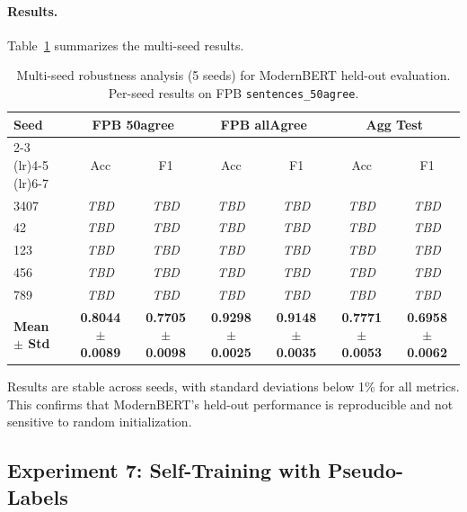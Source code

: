 \documentclass[11pt]{article}
\begin{document}
\paragraph{Results.}
Table~\ref{tab:multiseed} summarizes the multi-seed results.

\begin{table}[h]
\centering
\caption{Multi-seed robustness analysis (5 seeds) for ModernBERT held-out evaluation. Per-seed results on FPB \texttt{sentences\_50agree}.}
\label{tab:multiseed}
\begin{tabular}{lcccccc}
\toprule
\textbf{Seed} & \multicolumn{2}{c}{\textbf{FPB 50agree}} & \multicolumn{2}{c}{\textbf{FPB allAgree}} & \multicolumn{2}{c}{\textbf{Agg Test}} \\
\cmidrule(lr){2-3} \cmidrule(lr){4-5} \cmidrule(lr){6-7}
& Acc & F1 & Acc & F1 & Acc & F1 \\
\midrule
3407 & \textit{TBD} & \textit{TBD} & \textit{TBD} & \textit{TBD} & \textit{TBD} & \textit{TBD} \\
42   & \textit{TBD} & \textit{TBD} & \textit{TBD} & \textit{TBD} & \textit{TBD} & \textit{TBD} \\
123  & \textit{TBD} & \textit{TBD} & \textit{TBD} & \textit{TBD} & \textit{TBD} & \textit{TBD} \\
456  & \textit{TBD} & \textit{TBD} & \textit{TBD} & \textit{TBD} & \textit{TBD} & \textit{TBD} \\
789  & \textit{TBD} & \textit{TBD} & \textit{TBD} & \textit{TBD} & \textit{TBD} & \textit{TBD} \\
\midrule
\textbf{Mean $\pm$ Std} & \textbf{0.8044 $\pm$ 0.0089} & \textbf{0.7705 $\pm$ 0.0098} & \textbf{0.9298 $\pm$ 0.0025} & \textbf{0.9148 $\pm$ 0.0035} & \textbf{0.7771 $\pm$ 0.0053} & \textbf{0.6958 $\pm$ 0.0062} \\
\bottomrule
\end{tabular}
\end{table}

Results are stable across seeds, with standard deviations below 1\% for all metrics. This confirms that ModernBERT's held-out performance is reproducible and not sensitive to random initialization.

\subsection{Experiment 7: Self-Training with Pseudo-Labels}
\label{sec:self-training}
\end{document}
